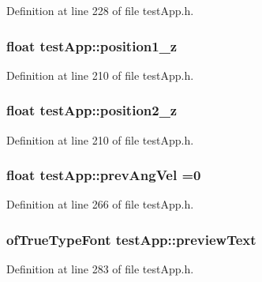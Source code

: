 Definition at line 228 of file test\-App.\-h.

\hypertarget{classtest_app_a808376783cdf510335cd1b37026e9bb3}{
\subsubsection[{position1\-\_\-z}]{\setlength{\rightskip}{0pt plus 5cm}float test\-App\-::position1\-\_\-z}}\label{classtest_app_a808376783cdf510335cd1b37026e9bb3}


Definition at line 210 of file test\-App.\-h.

\hypertarget{classtest_app_a0720011cfaade6388109232ea4927c19}{
\subsubsection[{position2\-\_\-z}]{\setlength{\rightskip}{0pt plus 5cm}float test\-App\-::position2\-\_\-z}}\label{classtest_app_a0720011cfaade6388109232ea4927c19}


Definition at line 210 of file test\-App.\-h.

\hypertarget{classtest_app_a8a2b9b9cf76097e20f148b616297029b}{
\subsubsection[{prev\-Ang\-Vel}]{\setlength{\rightskip}{0pt plus 5cm}float test\-App\-::prev\-Ang\-Vel =0}}\label{classtest_app_a8a2b9b9cf76097e20f148b616297029b}


Definition at line 266 of file test\-App.\-h.

\hypertarget{classtest_app_af5b1af55af2256ef3751de075fc7a9cc}{
\subsubsection[{preview\-Text}]{\setlength{\rightskip}{0pt plus 5cm}of\-True\-Type\-Font test\-App\-::preview\-Text}}\label{classtest_app_af5b1af55af2256ef3751de075fc7a9cc}


Definition at line 283 of file test\-App.\-h.

